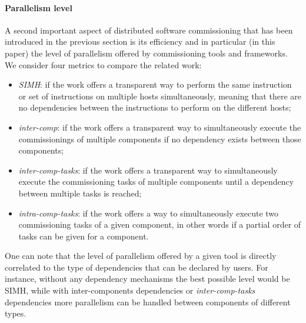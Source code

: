 \paragraph{Parallelism level}
A second important aspect of distributed software commissioning that
has been introduced in the previous section is its efficiency and in
particular (in this paper) the level of parallelism offered by
commissioning tools and frameworks. We consider four metrics to
compare the related work:
\begin{itemize}
\item \emph{SIMH}: if the work offers a transparent way to perform the
  same instruction or set of instructions on multiple hosts
  simultaneously, meaning that there are no dependencies between the
  instructions to perform on the different hosts;
  \item \emph{inter-comp}: if the work offers a transparent way to
    simultaneously execute the commissionings of multiple components
    if no dependency exists between those components;
  \item \emph{inter-comp-tasks}: if the work offers a transparent way to
    simultaneously execute the commissioning tasks of multiple
    components until a dependency between multiple tasks is reached;
  \item \emph{intra-comp-tasks}: if the work offers a way to simultaneously
    execute two commissioning tasks of a given component, in other
    words if a partial order of tasks can be given for a component.
\end{itemize}
One can note that the level of parallelism offered by a given tool is
directly correlated to the type of dependencies that can be declared
by users. For instance, without any dependency mechanisms the best
possible level would be SIMH, while with inter-components dependencies
or \emph{inter-comp-tasks} dependencies more parallelism can be
handled between components of different types.

